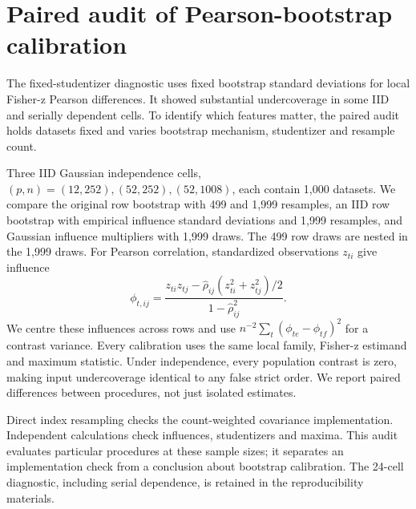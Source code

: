 \section{Paired audit of Pearson-bootstrap calibration}\label{sec:audit}
The fixed-studentizer diagnostic uses fixed bootstrap standard deviations for local Fisher-z Pearson differences. It showed substantial undercoverage in some IID and serially dependent cells. To identify which features matter, the paired audit holds datasets fixed and varies bootstrap mechanism, studentizer and resample count.

Three IID Gaussian independence cells, $(p,n)=(12,252),(52,252),(52,1008)$, each contain 1,000 datasets. We compare the original row bootstrap with 499 and 1,999 resamples, an IID row bootstrap with empirical influence standard deviations and 1,999 resamples, and Gaussian influence multipliers with 1,999 draws. The 499 row draws are nested in the 1,999 draws. For Pearson correlation, standardized observations $z_{ti}$ give influence
\[
 \phi_{t,ij}=\frac{z_{ti}z_{tj}-\widehat\rho_{ij}(z_{ti}^2+z_{tj}^2)/2}{1-\widehat\rho_{ij}^2}.
\]
We centre these influences across rows and use $n^{-2}\sum_t(\phi_{te}-\phi_{tf})^2$ for a contrast variance. Every calibration uses the same local family, Fisher-z estimand and maximum statistic. Under independence, every population contrast is zero, making input undercoverage identical to any false strict order. We report paired differences between procedures, not just isolated estimates.

Direct index resampling checks the count-weighted covariance implementation. Independent calculations check influences, studentizers and maxima. This audit evaluates particular procedures at these sample sizes; it separates an implementation check from a conclusion about bootstrap calibration. The 24-cell diagnostic, including serial dependence, is retained in the reproducibility materials.



